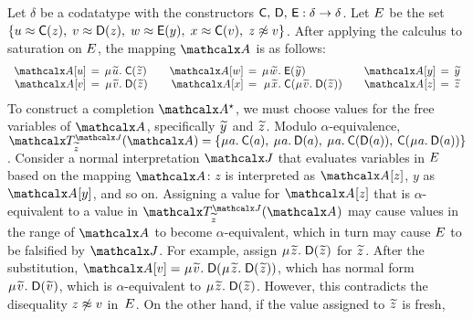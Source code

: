\begin{examplex}
Let $\delta$ be a codatatype with the constructors $\textsf{C},\, \textsf{D},\, \textsf{E} :\delta \rightarrow \delta$.
Let $E$ be the set
$\{
u \approx \textsf{C}( z ),\;
v \approx \textsf{D}( z ),\;
w \approx \textsf{E}( y ),\;
x \approx \textsf{C}( v ),\;
z \not\approx v
\}$.
After applying the calculus to saturation on $E$,
the mapping $\Val$ is as follows:
\[\begin{array}{r@{}c@{}r@{}l@{\qquad}r@{}c@{}r@{}l@{\qquad}r@{}c@{}l}
\Val \ec{u} & {}\,=\,{} & \MU {\Varec{u}}.\; & \const{C}( {\Varec{z}} ) &
\Val \ec{w} & = & \MU {\Varec{w}}.\; & \const{E}( {\Varec{y}} ) &
\Val \ec{y} & {}\,=\,{} & {\Varec{y}} \\
\Val \ec{v} & = & \MU {\Varec{v}}.\; & \const{D}( {\Varec{z}} ) &
\Val \ec{x} & {}\,=\,{} & \MU {\Varec{x}}.\; & \const{C}( \MU {\Varec{v}}.\; \const{D}( {\Varec{z}} ) ) &
\Val \ec{z} & = & {\Varec{z}}
\end{array}\]
%
To construct a completion $\ValC$, we must choose values for the free
variables of $\Val$, specifically ${\Varec{y}}$ and ${\Varec{z}}$.
Modulo $\alpha$-equivalence, $\smash{\Terms^{\smash{\J}}_{{\Varec{z}}}( \Val )} =
\{
\MU a.\: \const{C}( a ),\:
\MU a.\: \const{D}( a ),\allowbreak\:
\MU a.\: \const{C}( \const{D}( a )),\allowbreak\:
\const{C}( \MU a.\: \const{D}( a ))
\}
$.
Consider a normal interpretation $\J$ that evaluates variables in $E$ based on the mapping $\Val$:
$z$ is interpreted as $\Val \ec{z}$, $y$ as $\Val \ec{y}$, and so on.
Assigning a value for $\Val \ec{z}$ that is $\alpha$-equivalent to a value in $\Terms^{\smash{\J}}_{{\Varec{z}}}( \Val )$
may cause values in the range of $\Val$ to become $\alpha$-equivalent,
which in turn may cause $E$ to be falsified by $\J$.
For example, assign $\MU {\Varec{z}}.\; \const{D}( {\Varec{z}} )$ for ${\Varec{z}}$.
After the substitution, $\Val \ec{v} = \MU {\Varec{v}}.\; \const{D}( \MU {\Varec{z}}.\; \const{D}( {\Varec{z}} ) )$,
which has normal form $\MU {\Varec{v}}.\; \const{D}( {\Varec{v}} )$,
which is $\alpha$-equivalent to $\MU {\Varec{z}}.\; \const{D}( {\Varec{z}} )$.
However, this contradicts the disequality $z \not\approx v$ in~$E$.
On the other hand, if the value assigned to ${\Varec{z}}$ is fresh, %

\end{examplex}
